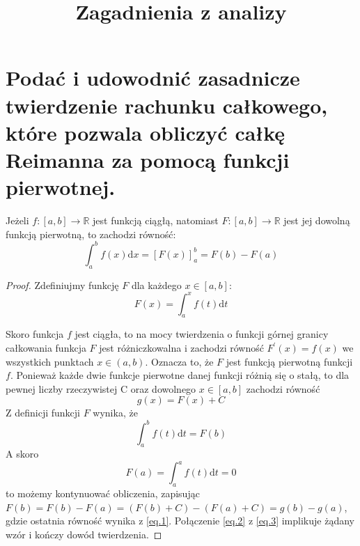 \documentclass{article}
\title{Zagadnienia z analizy}
\theoremstyle{definition}
\theoremstyle{case}
\begin{document}
\makeatletter
{}
\makeatother

\begin{titlepage}
	\vspace*{\fill}
	\begin{center}
		\makeatletter
		\LARGE
		\@title
		\makeatother
	\end{center}
	\vspace*{\fill}
	\tableofcontents
\end{titlepage}

\newpage

\setcounter{page}{1}

\setcounter{section}{63}

\section{Podać i udowodnić zasadnicze twierdzenie rachunku całkowego,
które pozwala obliczyć całkę Reimanna za pomocą funkcji pierwotnej.}

Jeżeli ${f \colon [a,b] \to \mathbb{R}}$ jest funkcją ciągłą, natomiast ${F \colon [a,b] \to \mathbb{R}}$
jest jej dowolną funkcją pierwotną, to zachodzi równość:
\begin{equation*}
	\int_a^b f(x) \mathrm{d}x = [ F(x) ]_a^b = F(b) - F(a)
\end{equation*}

\begin{proof}
	Zdefiniujmy funkcję $F$ dla każdego ${x \in [a,b]}$:
	\begin{equation*}
		F(x) = \textstyle \int_a^x f(t) \mathrm{d}t
	\end{equation*}

	Skoro funkcja $f$ jest ciągła, to na mocy twierdzenia o funkcji
	górnej granicy całkowania funkcja $F$ jest różniczkowalna
	i zachodzi równość ${F^\prime(x)=f(x)}$ we wszystkich punktach ${x \in (a,b)}$.
	Oznacza to, że $F$ jest funkcją pierwotną funkcji $f$.
	Ponieważ każde dwie funkcje pierwotne danej funkcji różnią się o stałą,
	to dla pewnej liczby rzeczywistej C oraz dowolnego ${x \in [a,b]}$
	zachodzi równość
	\begin{equation}
		\label{eq.1}
		g(x)=F(x)+C
	\end{equation}
	Z definicji funkcji $F$ wynika, że
	\begin{equation}
		\label{eq.2}
		\textstyle \int_a^b f(t) \mathrm{d}t = F(b)
	\end{equation}
	A skoro
	\begin{equation}
		\label{eq.3}
		F(a) = \textstyle \int_a^a f(t) \mathrm{d}t=0
	\end{equation}
	to możemy kontynuować obliczenia, zapisując
	${F(b)=F(b)-F(a)=(F(b)+C)-(F(a)+C)=g(b)-g(a)}$,
	gdzie ostatnia równość wynika z \eqref{eq.1}. Połączenie \eqref{eq.2} z \eqref{eq.3} implikuje żądany wzór i kończy dowód twierdzenia.
\end{proof}
\end{document}
